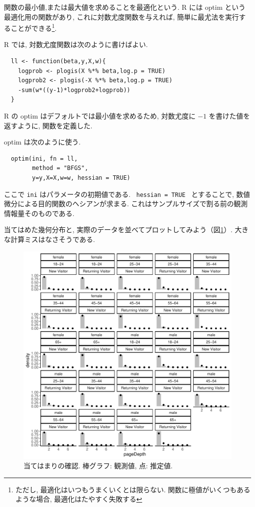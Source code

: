 \documentclass[a4paper, 12pt]{jarticle}
\begin{document}
関数の最小値,または最大値を求めることを最適化という. 
R には optim という最適化用の関数があり, これに対数尤度関数を与えれば, 簡単に最尤法を実行することができる\footnote{ただし, 最適化はいつもうまくいくとは限らない. 関数に極値がいくつもあるような場合, 最適化はたやすく失敗する}. 

R では, 対数尤度関数は次のように書けばよい. 

\begin{verbatim}
  ll <- function(beta,y,X,w){
    logprob <- plogis(X %*% beta,log.p = TRUE)
    logprob2 <- plogis(-X %*% beta,log.p = TRUE)
    -sum(w*((y-1)*logprob2+logprob))
  }
\end{verbatim}

R の optim はデフォルトでは最小値を求めるため, 対数尤度に $-1$ を書けた値を返すように, 関数を定義した. 

optim は次のように使う.
\begin{verbatim}
  optim(ini, fn = ll,
        method = "BFGS",
        y=y,X=X,w=w, hessian = TRUE)
\end{verbatim}
ここで \verb|ini| はパラメータの初期値である. \verb| hessian = TRUE | とすることで, 数値微分による目的関数のヘシアンが求まる. これはサンプルサイズで割る前の観測情報量そのものである. 

当てはめた幾何分布と, 実際のデータを並べてプロットしてみよう（図\ref{fitgeomreg}）. 
大きな計算ミスはなさそうである. 

\begin{figure}
\includegraphics[width=13cm,clip]{./img/fitgeomreg.pdf}
\caption{当てはまりの確認. 棒グラフ: 観測値, 点: 推定値.}
\label{fitgeomreg}
\end{figure}
\end{document}
